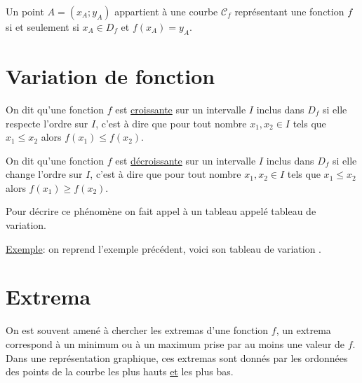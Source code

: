 \documentclass[french]{book}
\begin{document}
\begin{prop}
Un point $A=(x_A;y_A)$ appartient à une courbe $\mathcal{C}_f$ représentant une fonction $f$ si et seulement si $x_A \in D_f$ et $f(x_A)=y_A$.
\end{prop}

\section{Variation de fonction}
\begin{defn}
On dit qu'une fonction $f$ est \underline{croissante} sur un intervalle $I$ inclus dans $D_f$ si elle respecte l'ordre sur $I$, c'est à dire que pour tout nombre $x_1,x_2\in I$ tels que $x_1 \leq x_2$ alors $f(x_1) \leq f(x_2)$. %
\end{defn}

\begin{defn}
On dit qu'une fonction $f$ est \underline{décroissante} sur un intervalle $I$ inclus dans $D_f$ si elle change l'ordre sur $I$, c'est à dire que pour tout nombre $x_1,x_2\in I$ tels que $x_1 \leq x_2$ alors $f(x_1) \geq f(x_2)$. %
\end{defn}

Pour décrire ce phénomène on fait appel à un tableau appelé tableau de variation.

\underline{Exemple}: on reprend l'exemple précédent, voici son tableau de variation .

\begin{center}
\end{center}




\section{Extrema}
On est souvent amené à chercher les extremas d'une fonction $f$, un extrema correspond à un minimum ou à un maximum prise par au moins une valeur de $f$. Dans une représentation graphique, ces extremas sont donnés par les ordonnées des points de la courbe les plus hauts \underline{et} les plus bas.\\
\end{document}
